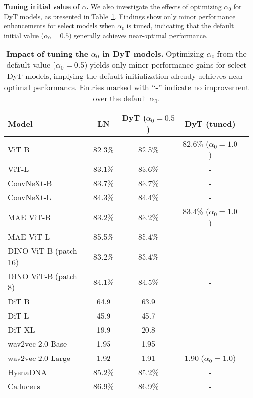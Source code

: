 \documentclass[]{fairmeta}
\newcommand{\tablestyle}[2]{\setlength{\tabcolsep}{#1}\renewcommand{\arraystretch}{#2}\centering\footnotesize}
\renewcommand{\paragraph}[1]{\vspace{1.25mm}\noindent\textbf{#1}}
\begin{document}
\paragraph{Tuning initial value of $\alpha$.} We also investigate the effects of optimizing $\alpha_0$ for DyT models, as presented in Table~\ref{table:tune_alpha}. Findings show only minor performance enhancements for select models when $\alpha_0$ is tuned, indicating that the default initial value ($\alpha_0 = 0.5$) generally achieves near-optimal performance.



\begin{table}[h]
\vskip -0.07in
\centering
\tablestyle{7pt}{1.15}
\begin{tabular}{lcccc}
\toprule
Model & LN  & DyT ($\alpha_0 = 0.5$) & DyT (tuned) \\
\midrule
ViT-B & 82.3\% & 82.5\% & 82.6\% \scriptsize{($\alpha_0 = 1.0$)} \\
ViT-L & 83.1\% & 83.6\% & - \\
ConvNeXt-B & 83.7\% & 83.7\% & - \\
ConvNeXt-L & 84.3\% & 84.4\% & - \\
\midrule
MAE ViT-B & 83.2\% & 83.2\% & 83.4\% \scriptsize{($\alpha_0 = 1.0$)} \\
MAE ViT-L & 85.5\% & 85.4\% & - \\
DINO ViT-B (patch 16) & 83.2\% & 83.4\% & - \\
DINO ViT-B (patch 8) & 84.1\% & 84.5\% & - \\
\midrule
DiT-B & 64.9 & 63.9 & - \\
DiT-L & 45.9 & 45.7 & - \\
DiT-XL & 19.9 & 20.8 & -  \\
\midrule
wav2vec 2.0 Base & 1.95 & 1.95 & - \\
wav2vec 2.0 Large & 1.92 & 1.91 & 1.90 \scriptsize{($\alpha_0 = 1.0$)} \\
\midrule
HyenaDNA & 85.2\% & 85.2\% & -  \\
Caduceus & 86.9\% & 86.9\% & - \\
\midrule
  \end{tabular}
 \caption{\textbf{Impact of tuning the $\alpha_0$ in DyT models.} Optimizing $\alpha_0$ from the default value ($\alpha_0 = 0.5$)  yields only minor performance gains for select DyT models, implying the default initialization already achieves near-optimal performance. Entries marked with ``-'' indicate no improvement over the default $\alpha_0$.
}
\label{table:tune_alpha}
\end{table}
\end{document}
